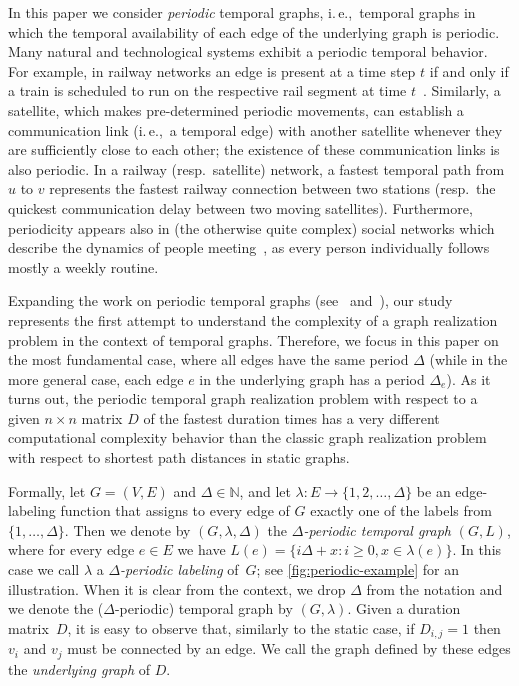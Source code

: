 \documentclass[a4paper,UKenglish,cleveref, autoref, thm-restate]{lipics-v2021}
\newcommand{\ie}{i.\,e.,\ }
\begin{document}
In this paper we consider \emph{periodic} temporal graphs, \ie temporal graphs in which the temporal availability of each edge of the underlying graph is periodic. 
Many natural and technological systems exhibit a periodic temporal behavior. For example, in railway networks an edge is present at a time step $t$ if and
only if a train is scheduled to run on the respective rail segment at time $t$~\cite{Arrighi2023Multi}. 
Similarly, a satellite, which makes pre-determined periodic movements, can establish a communication link (\ie a temporal edge) with another satellite whenever they are sufficiently close to each other; the existence of these communication links is also periodic. 
In a railway (resp.~satellite) network, a fastest temporal path from $u$ to $v$ represents the fastest railway connection between two stations 
(resp.~the quickest communication delay between two moving satellites). 
Furthermore, periodicity appears also in (the otherwise quite complex) social networks which describe the dynamics of people meeting~\cite{snapnets,sapiezynski2015tracking}, as every person individually follows mostly a weekly routine.%

Expanding the work on periodic temporal graphs
(see~\cite[Class 8]{casteigts2012time} and~\cite{Arrighi2023Multi,ErlebachS20,morawietz2021timecop,morawietz2020timecop}), 
our study represents the first attempt to understand the complexity of a graph realization problem in the context of temporal graphs. 
Therefore, we focus in this paper on the most fundamental case, where all edges have the same period $\Delta$ 
(while in the more general case, each edge $e$ in the underlying graph has a period $\Delta_e$).
As it turns out, the periodic temporal graph realization problem with respect to a given $n \times n$ matrix $D$ of the fastest duration times has a very different computational complexity behavior than the classic graph realization problem with respect to shortest path distances in static graphs. 








Formally, let $G=(V,E)$ and $\Delta\in \mathbb{N}$, and let $\lambda: E \rightarrow \{1,2,\ldots,\Delta\}$ be an edge-labeling function that assigns to every edge of $G$ exactly one of the labels from $\{1,\ldots,\Delta\}$. 
Then we denote by $(G,\lambda,\Delta)$ the \emph{$\Delta$-periodic temporal graph} $(G,L)$, where for every edge $e\in E$ we have $L(e)=\{i\Delta + x : i\geq 0, x\in \lambda(e)\}$. 
In this case we call $\lambda$ a \emph{$\Delta$-periodic labeling} of~$G$; see \cref{fig:periodic-example} for an illustration. 
When it is clear from the context, we drop $\Delta$ from the notation and 
we denote the ($\Delta$-periodic) temporal graph by $(G,\lambda)$.
Given a duration matrix~$D$, it is easy to observe that, similarly to the static case, if $D_{i,j}=1$ then $v_i$ and $v_j$ must be connected by an edge. We call the graph defined by these edges the \emph{underlying graph} of $D$.
\end{document}
